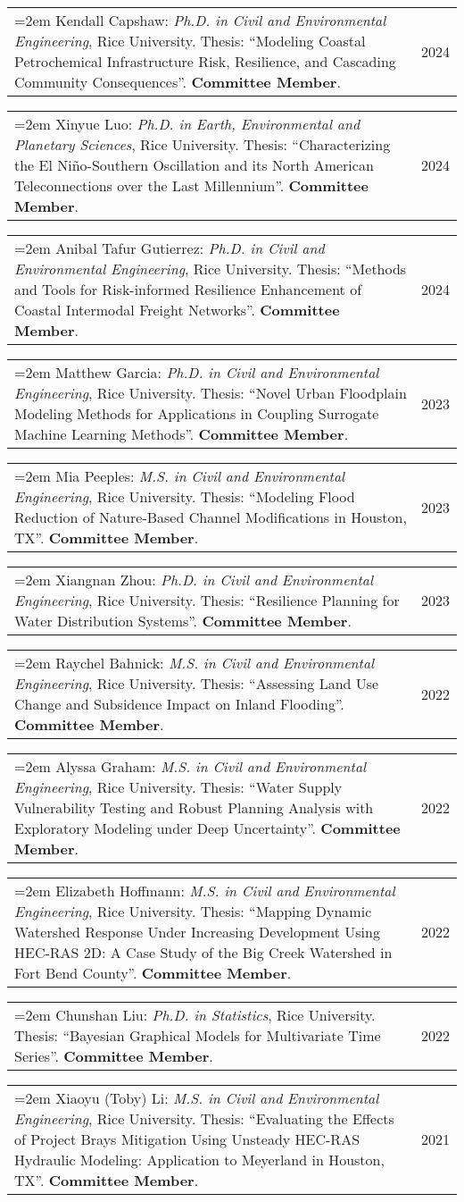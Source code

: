\documentclass[10pt,oneside]{article}
\makeatletter
\newenvironment{alignedentrieshang}[1][2em]{%
  \noindent%
}{%
}
\newcommand{\hangingitem}[2]{%
  \noindent%
  \begin{tabular*}{\textwidth}{@{}p{0.85\textwidth}@{\extracolsep{\fill}}r@{}}%
    \hangindent=2em \hangafter=1 #1 & #2%
  \end{tabular*}%
}
\makeatother
\begin{document}
\begin{alignedentrieshang}
\hangingitem{Kendall Capshaw: \textit{Ph.D. in Civil and Environmental Engineering}, Rice University. Thesis: \enquote{Modeling Coastal Petrochemical Infrastructure Risk, Resilience, and Cascading Community Consequences}. \textbf{Committee Member}.}{2024}

\hangingitem{Xinyue Luo: \textit{Ph.D. in Earth, Environmental and Planetary Sciences}, Rice University. Thesis: \enquote{Characterizing the El Niño-Southern Oscillation and its North American Teleconnections over the Last Millennium}. \textbf{Committee Member}.}{2024}

\hangingitem{Anibal Tafur Gutierrez: \textit{Ph.D. in Civil and Environmental Engineering}, Rice University. Thesis: \enquote{Methods and Tools for Risk-informed Resilience Enhancement of Coastal Intermodal Freight Networks}. \textbf{Committee Member}.}{2024}

\hangingitem{Matthew Garcia: \textit{Ph.D. in Civil and Environmental Engineering}, Rice University. Thesis: \enquote{Novel Urban Floodplain Modeling Methods for Applications in Coupling Surrogate Machine Learning Methods}. \textbf{Committee Member}.}{2023}

\hangingitem{Mia Peeples: \textit{M.S. in Civil and Environmental Engineering}, Rice University. Thesis: \enquote{Modeling Flood Reduction of Nature-Based Channel Modifications in Houston, TX}. \textbf{Committee Member}.}{2023}

\hangingitem{Xiangnan Zhou: \textit{Ph.D. in Civil and Environmental Engineering}, Rice University. Thesis: \enquote{Resilience Planning for Water Distribution Systems}. \textbf{Committee Member}.}{2023}

\hangingitem{Raychel Bahnick: \textit{M.S. in Civil and Environmental Engineering}, Rice University. Thesis: \enquote{Assessing Land Use Change and Subsidence Impact on Inland Flooding}. \textbf{Committee Member}.}{2022}

\hangingitem{Alyssa Graham: \textit{M.S. in Civil and Environmental Engineering}, Rice University. Thesis: \enquote{Water Supply Vulnerability Testing and Robust Planning Analysis with Exploratory Modeling under Deep Uncertainty}. \textbf{Committee Member}.}{2022}

\hangingitem{Elizabeth Hoffmann: \textit{M.S. in Civil and Environmental Engineering}, Rice University. Thesis: \enquote{Mapping Dynamic Watershed Response Under Increasing Development Using HEC-RAS 2D: A Case Study of the Big Creek Watershed in Fort Bend County}. \textbf{Committee Member}.}{2022}

\hangingitem{Chunshan Liu: \textit{Ph.D. in Statistics}, Rice University. Thesis: \enquote{Bayesian Graphical Models for Multivariate Time Series}. \textbf{Committee Member}.}{2022}

\hangingitem{Xiaoyu (Toby) Li: \textit{M.S. in Civil and Environmental Engineering}, Rice University. Thesis: \enquote{Evaluating the Effects of Project Brays Mitigation Using Unsteady HEC-RAS Hydraulic Modeling: Application to Meyerland in Houston, TX}. \textbf{Committee Member}.}{2021}

\end{alignedentrieshang}
\end{document}
